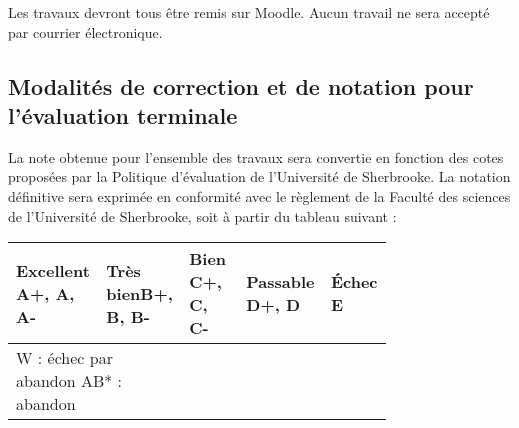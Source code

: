 \documentclass[12]{article}
\begin{document}
	Les travaux devront tous être remis sur Moodle. Aucun travail ne sera
	accepté par courrier électronique.

	\subsection*{Modalités de correction et de notation pour l'évaluation terminale}

	La note obtenue pour l’ensemble des travaux sera convertie en fonction des
	cotes proposées par la Politique d’évaluation de l’Université de Sherbrooke.
	La notation définitive sera exprimée en conformité avec le règlement de la
	Faculté des sciences de l’Université de Sherbrooke, soit à partir du tableau
	suivant :
	
	\begin{center}
		\begin{table}[h]
        \begin{tabular}{| p{0.15\linewidth} | p{0.15\linewidth} | p{0.15\linewidth} | p{0.15\linewidth} | p{0.15\linewidth} | } 
        \hline
        \textbf{Excellent} \linebreak A+, A, A- &
		\textbf{Très bien}\hfill\hfill \linebreak B+, B, B- & 
		\textbf{Bien} \linebreak C+, C, C- & 
		\textbf{Passable} \linebreak D+, D &
		\textbf{Échec} \linebreak E \\ [0.5ex] 
        \hline\hline
        \multicolumn{2}{l}{W : échec par abandon\hfill\hfill \linebreak
            AB* : abandon\hfill\hfill \linebreak} &

\end{tabular}
\end{table}
\end{center}
\end{document}

